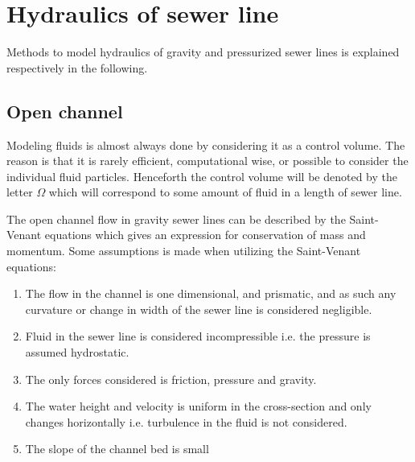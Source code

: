 \section{Hydraulics of sewer line}\label{se:hydraulics_of_sewer_line}
Methods to model hydraulics of gravity and pressurized sewer lines is explained respectively in the following. 


\subsection{Open channel}\label{subse:open_channel}
Modeling fluids is almost always done by considering it as a control volume. The reason is that it is rarely efficient, computational wise, or possible to consider the individual fluid particles.
Henceforth the control volume will be denoted by the letter $\Omega$ which will correspond to some amount of fluid in a length of sewer line.		

The open channel flow in gravity sewer lines can be described by the Saint-Venant equations which gives an expression for conservation of mass and momentum.
Some assumptions is made when utilizing the Saint-Venant equations:

\begin{table}[H]
\begin{enumerate}
\item The flow in the channel is one dimensional, and prismatic, and as such any curvature or change in width of the sewer line is considered negligible.
\item Fluid in the sewer line is considered incompressible i.e. the pressure is assumed hydrostatic.
\item The only forces considered is friction, pressure and gravity.
\item The water height and velocity is uniform in the cross-section and only changes horizontally i.e. turbulence in the fluid is not considered.
\item The slope of the channel bed is small
\end{enumerate}
\label{tab:saintbernard_assumptions}
\end{table}


